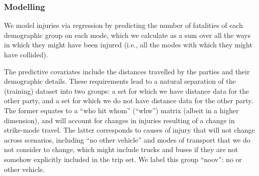 \documentclass{article}
\begin{document}
\subsubsection{Modelling}

We model injuries via regression by predicting the number of fatalities of each demographic group on each mode, which we calculate as a sum over all the ways in which they might have been injured (i.e., all the modes with which they might have collided). 

The predictive covariates include the distances travelled by the parties and their demographic details. These requirements lead to a natural separation of the (training) dataset into two groups: a set for which we have distance data for the other party, and a set for which we do not have distance data for the other party. The former equates to a ``who hit whom'' (``whw'') matrix (albeit in a higher dimension), and will account for changes in injuries resulting of a change in strike-mode travel. The latter corresponds to causes of injury that will not change across scenarios, including ``no other vehicle'' and modes of transport that we do not consider to change, which might include trucks and buses if they are not somehow explicitly included in the trip set. We label this group ``noov'': no or other vehicle.
\end{document}
